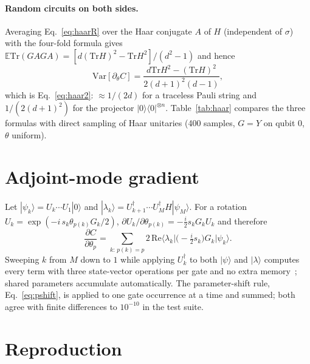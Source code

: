 \documentclass[11pt]{article}
\newcommand{\Var}{\mathrm{Var}}
\newcommand{\Tr}{\mathrm{Tr}}
\newcommand{\E}{\mathbb{E}}
\begin{document}
\paragraph{Random circuits on both sides.}
Averaging Eq.~\eqref{eq:haarR} over the Haar conjugate $A$ of $H$ (independent of $\sigma$) with the four-fold formula gives $\E\Tr(GAGA)=[d(\Tr H)^2-\Tr H^2]/(d^2-1)$ and hence
\begin{equation*}
  \Var[\partial_\theta C]=\frac{d\Tr H^2-(\Tr H)^2}{2(d+1)^2(d-1)},
\end{equation*}
which is Eq.~\eqref{eq:haar2}: $\approx 1/(2d)$ for a traceless Pauli string and $1/(2(d+1)^2)$ for the projector $|0\rangle\langle0|^{\otimes n}$. Table~\ref{tab:haar} compares the three formulas with direct sampling of Haar unitaries (400 samples, $G=Y$ on qubit 0, $\theta$ uniform).

\begin{table}[h]
\centering\small

\caption{Numerical check of Eqs.~\eqref{eq:haar2}, \eqref{eq:haarL}, \eqref{eq:haarR}. Upper block: $H=Z^{\otimes n}$; lower block: $H=|0\rangle\langle 0|^{\otimes n}$. Sampling error is about 10\% at 400 samples.}
\label{tab:haar}
\end{table}

\section{Adjoint-mode gradient}
\label{app:adjoint}

Let $|\psi_k\rangle=U_k\cdots U_1|0\rangle$ and $|\lambda_k\rangle=U_{k+1}^\dagger\cdots U_M^\dagger H|\psi_M\rangle$. For a rotation $U_k=\exp(-i\,s_k\theta_{p(k)}G_k/2)$, $\partial U_k/\partial\theta_{p(k)}=-\tfrac i2 s_kG_kU_k$ and therefore
\begin{equation}
  \frac{\partial C}{\partial\theta_p}=\sum_{k:\,p(k)=p}2\,\mathrm{Re}\Big\langle\lambda_k\Big|\Big(-\tfrac i2 s_k\Big)G_k\Big|\psi_k\Big\rangle .
\end{equation}
Sweeping $k$ from $M$ down to $1$ while applying $U_k^\dagger$ to both $|\psi\rangle$ and $|\lambda\rangle$ computes every term with three state-vector operations per gate and no extra memory~\cite{jones2020}; shared parameters accumulate automatically. The parameter-shift rule, Eq.~\eqref{eq:pshift}, is applied to one gate occurrence at a time and summed; both agree with finite differences to $10^{-10}$ in the test suite.

\section{Reproduction}
\label{app:repro}
\end{document}
